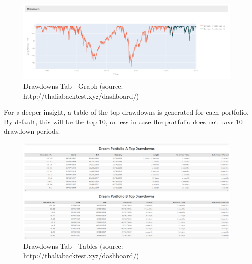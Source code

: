 \documentclass[main.tex]{subfiles}
\begin{document}
\begin{figure}[H]

   \centering

   \includegraphics[width=\textwidth]{08Appendices/081User/081Pictures/drawdowns_graph.png}

   \caption{Drawdowns Tab - Graph (source: http://thaliabacktest.xyz/dashboard/)}

   \label{drawdowns_graph}

\end{figure}



For a deeper insight, a table of the top drawdowns is generated for each portfolio. By default, this will be the top 10, or less in case the portfolio does not have 10 drawdown periods. 



\begin{figure}[H]

   \centering

   \includegraphics[width=\textwidth]{08Appendices/081User/081Pictures/drawdowns_tables.png}

   \caption{Drawdowns Tab - Tables (source: http://thaliabacktest.xyz/dashboard/)}

   \label{drawdowns_table}

\end{figure}
\end{document}
